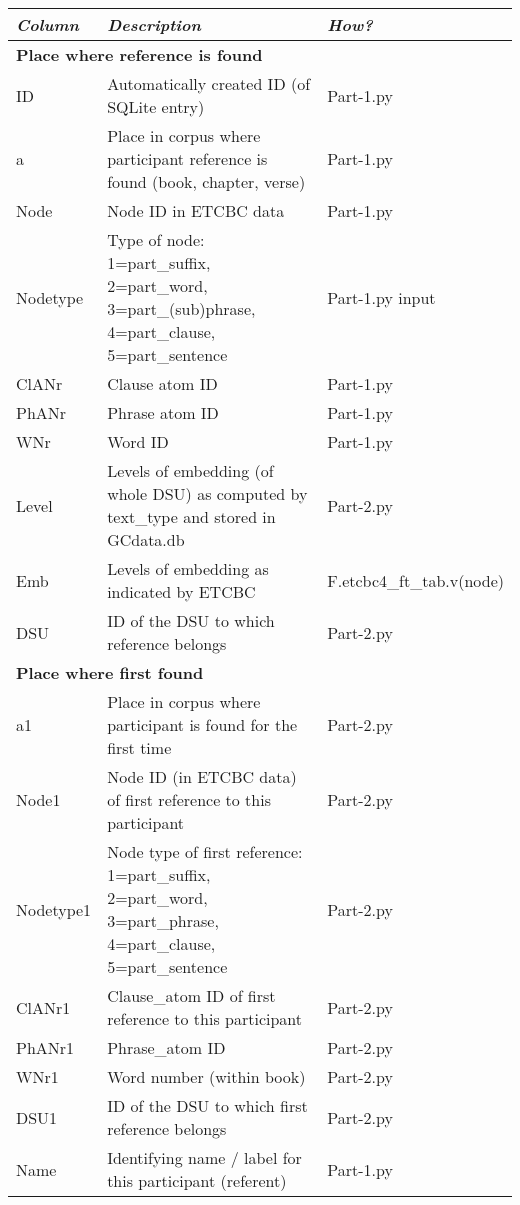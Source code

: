 \documentclass{article}
\newcommand{\fixme}[1]{\color{red} #1}
\begin{document}
\begin{longtable}{|l|p{}|l|}
\hline
\emph{Column} & \emph{Description} & \emph{How?}\\ \hline
\multicolumn{3}{|l|}{\bf{Place where reference is found}} \\ \hline
ID & Automatically created ID (of SQLite entry) & Part-1.py \\ \hline
a & Place in corpus where participant reference is found (book, chapter, verse) & Part-1.py \\ \hline
Node & Node ID in ETCBC data & Part-1.py \\ \hline
Nodetype & Type of node: 1=part\_suffix, 2=part\_word, 3=part\_(sub)phrase, 4=part\_clause, 5=part\_sentence & Part-1.py input\\ \hline
ClANr & Clause atom ID & Part-1.py \\ \hline
PhANr & Phrase atom ID & Part-1.py \\ \hline
WNr & Word ID & Part-1.py \\ \hline
Level & Levels of embedding (of whole DSU) as computed by text\_type and stored in GCdata.db & Part-2.py\\ \hline
Emb & Levels of embedding as indicated by ETCBC & \fixme{F.etcbc4\_ft\_tab.v(node)} \\ \hline
DSU & ID of the DSU to which reference belongs & Part-2.py \\ \hline

\multicolumn{3}{|l|}{\bf{Place where first found}} \\ \hline

a1 & Place in corpus where participant is found for the first time & Part-2.py \\ \hline
Node1 & Node ID (in ETCBC data) of first reference to this participant & Part-2.py \\ \hline
Nodetype1 & Node type of first reference: 1=part\_suffix, 2=part\_word, 3=part\_phrase, 4=part\_clause, 5=part\_sentence & Part-2.py\\ \hline
ClANr1 & Clause\_atom ID of first reference to this participant & Part-2.py\\ \hline
PhANr1 & Phrase\_atom ID & Part-2.py\\ \hline
WNr1 & Word number (within book) & Part-2.py\\ \hline
DSU1 & ID of the DSU to which first reference belongs & Part-2.py\\ \hline
Name & Identifying name / label for this participant (referent) & Part-1.py \\ \hline


\end{longtable}
\end{document}
